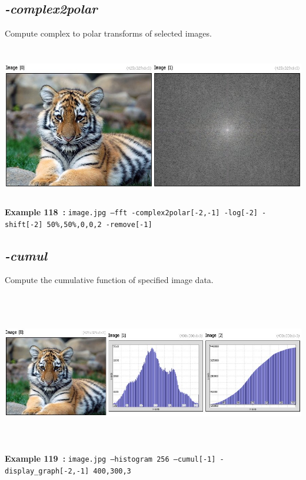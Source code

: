 \documentclass[a4paper,11pt,twoside]{book}
\begin{document}
\subsection{\emph{-complex2polar} }\vspace*{-0.5em}
Compute complex to polar transforms of selected images.
\begin{center}\includegraphics[keepaspectratio=true,height=7cm,width=\textwidth]{img/gmic_def118.jpg}\\
{\footnotesize \textbf{Example 118~:} \texttt{image.jpg --fft -complex2polar[-2,-1] -log[-2] -shift[-2] 50\%,50\%,0,0,2 -remove[-1]}}
\end{center}

\subsection{\emph{-cumul} }\vspace*{-0.5em}
Compute the cumulative function of specified image data.
\begin{center}\includegraphics[keepaspectratio=true,height=7cm,width=\textwidth]{img/gmic_def119.jpg}\\
{\footnotesize \textbf{Example 119~:} \texttt{image.jpg --histogram 256 --cumul[-1] -display\_graph[-2,-1] 400,300,3}}
\end{center}
\end{document}
